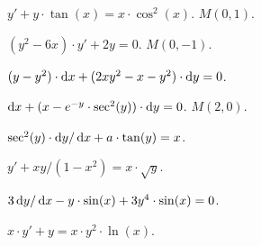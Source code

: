 \begin{problem}
	$y' + y \cdot \tan (x) = x \cdot \cos^2 (x)$.  $M(0, 1)$.
\end{problem}

\begin{problem}
	$(y^2 - 6 x) \cdot y' + 2 y = 0$.  $M(0, -1)$.
\end{problem}

\begin{problem}
	$(y - y^2) \cdot \mathop{}\!\mathrm{d} x + (2 x y^2 - x - y^2) \cdot \mathop{}\!\mathrm{d} y = 0$.
\end{problem}

\begin{problem}
	$\mathop{}\!\mathrm{d} x + (x - e^{-y} \cdot \sec^2 (y)) \cdot \mathop{}\!\mathrm{d} y = 0$.  $M(2, 0)$.
\end{problem}

\begin{problem}
	$\sec^2 (y) \cdot \mathop{}\!\mathrm{d} y / \mathop{}\!\mathrm{d} x + a \cdot \tan (y) = x$.
\end{problem}

\begin{problem}
	$y' + x y / (1 - x^2) = x \cdot \sqrt{y}$.
\end{problem}

\begin{problem}
	$3 \mathop{}\!\mathrm{d} y / \mathop{}\!\mathrm{d} x - y \cdot \sin (x) + 3 y^4 \cdot \sin (x) = 0$.
\end{problem}

\begin{problem}
	$x \cdot y' + y = x \cdot y^2 \cdot \ln (x)$.
\end{problem}
